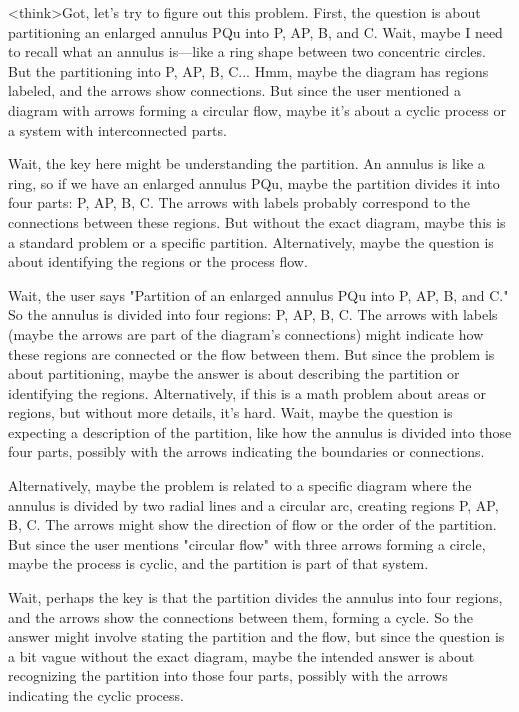 <think>Got, let's try to figure out this problem. First, the question is about partitioning an enlarged annulus PQu into P, AP, B, and C. Wait, maybe I need to recall what an annulus is—like a ring shape between two concentric circles. But the partitioning into P, AP, B, C... Hmm, maybe the diagram has regions labeled, and the arrows show connections. But since the user mentioned a diagram with arrows forming a circular flow, maybe it's about a cyclic process or a system with interconnected parts.

Wait, the key here might be understanding the partition. An annulus is like a ring, so if we have an enlarged annulus PQu, maybe the partition divides it into four parts: P, AP, B, C. The arrows with labels probably correspond to the connections between these regions. But without the exact diagram, maybe this is a standard problem or a specific partition. Alternatively, maybe the question is about identifying the regions or the process flow.

Wait, the user says "Partition of an enlarged annulus PQu into P, AP, B, and C." So the annulus is divided into four regions: P, AP, B, C. The arrows with labels (maybe the arrows are part of the diagram's connections) might indicate how these regions are connected or the flow between them. But since the problem is about partitioning, maybe the answer is about describing the partition or identifying the regions. Alternatively, if this is a math problem about areas or regions, but without more details, it's hard. Wait, maybe the question is expecting a description of the partition, like how the annulus is divided into those four parts, possibly with the arrows indicating the boundaries or connections.

Alternatively, maybe the problem is related to a specific diagram where the annulus is divided by two radial lines and a circular arc, creating regions P, AP, B, C. The arrows might show the direction of flow or the order of the partition. But since the user mentions "circular flow" with three arrows forming a circle, maybe the process is cyclic, and the partition is part of that system.

Wait, perhaps the key is that the partition divides the annulus into four regions, and the arrows show the connections between them, forming a cycle. So the answer might involve stating the partition and the flow, but since the question is a bit vague without the exact diagram, maybe the intended answer is about recognizing the partition into those four parts, possibly with the arrows indicating the cyclic process.

